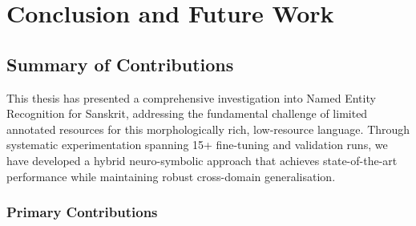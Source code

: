 
\chapter{Conclusion and Future Work}
\label{chap:conclusion}

\section{Summary of Contributions}

This thesis has presented a comprehensive investigation into Named Entity Recognition for Sanskrit, addressing the fundamental challenge of limited annotated resources for this morphologically rich, low-resource language. Through systematic experimentation spanning 15+ fine-tuning and validation runs, we have developed a hybrid neuro-symbolic approach that achieves state-of-the-art performance while maintaining robust cross-domain generalisation.

\subsection{Primary Contributions}

